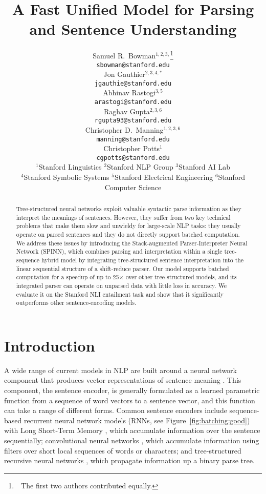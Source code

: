 \documentclass[11pt]{article}
\title{A Fast Unified Model for Parsing and Sentence Understanding}
\author{
Samuel R.\ Bowman$^{1,2,3,}$\thanks{~\,The first two authors contributed equally.} \\
\texttt{\small sbowman@stanford.edu} \\
\And
Jon Gauthier$^{2,3,4,*}$ \\
\texttt{\small jgauthie@stanford.edu} \\
\And
Abhinav Rastogi$^{3,5}$ \\
\texttt{\small arastogi@stanford.edu} \\
\AND
Raghav Gupta$^{2,3,6}$ \\
\texttt{\small rgupta93@stanford.edu} \\
\And
Christopher D.\ Manning$^{1,2,3,6}$\\
\texttt{\small manning@stanford.edu}\\
\And
Christopher Potts$^{1}$\\
\texttt{\small cgpotts@stanford.edu}
\AND\\[-3ex]
{$^{1}$Stanford Linguistics\quad
$^{2}$Stanford NLP Group\quad
$^{3}$Stanford AI Lab}\\
{$^{4}$Stanford Symbolic Systems\quad
$^{5}$Stanford Electrical Engineering\quad
$^{6}$Stanford Computer Science}
}
\date{}
\begin{document}
\maketitle
\begin{abstract}

Tree-structured neural networks exploit valuable syntactic parse information as they interpret the meanings of sentences. However, they suffer from two key technical problems that make them slow and unwieldy for large-scale NLP tasks: they usually operate on parsed sentences and they do not directly support batched computation. We address these issues by introducing the Stack-augmented Parser-Interpreter Neural Network (SPINN), which combines parsing and interpretation within a single tree-sequence hybrid model by integrating tree-structured sentence interpretation into the linear sequential structure of a shift-reduce parser. Our model supports batched computation for a speedup of up to 25$\times$ over other tree-structured models, and its integrated parser can operate on unparsed data with little loss in accuracy. We evaluate it on the Stanford NLI entailment task and show that it significantly outperforms other sentence-encoding models.
\end{abstract}

\section{Introduction}




A wide range of current models in NLP are built around a neural network component that produces vector representations of sentence meaning \citep[e.g.,][]{sutskever2014sequence,tai2015improved}. This component, the sentence encoder, is generally formulated as a learned parametric function from a sequence of word vectors to a sentence vector, and this function can take a range of different forms. Common sentence encoders include sequence-based recurrent neural network models (RNNs, see Figure~\ref{fig:batching:good}) with Long Short-Term Memory \citep[LSTM,][]{hochreiter1997long}, which accumulate information over the sentence sequentially; convolutional neural networks \citep{kalchbrenner2014convolutional,DBLP:journals/corr/ZhangZL15}, which accumulate information using filters over short local sequences of words or characters; and tree-structured recursive neural networks \citep[TreeRNNs,][see Figure~\ref{fig:batching:bad}]{goller1996learning,socher2011parsing}, which propagate information up a binary parse tree.
\end{document}
